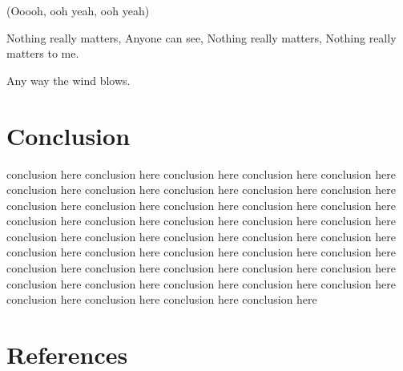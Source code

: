 \documentclass{gshs_poster_rpt}
\begin{document}
\begin{multicols}{3}
(Ooooh, ooh yeah, ooh yeah)

Nothing really matters,
Anyone can see,
Nothing really matters,
Nothing really matters to me.

Any way the wind blows.

\section*{Conclusion}
conclusion here conclusion here conclusion here conclusion here conclusion here conclusion here conclusion here conclusion here conclusion here conclusion here conclusion here conclusion here conclusion here conclusion here conclusion here conclusion here conclusion here conclusion here conclusion here conclusion here conclusion here conclusion here conclusion here conclusion here conclusion here conclusion here conclusion here conclusion here conclusion here conclusion here conclusion here conclusion here conclusion here conclusion here conclusion here conclusion here conclusion here conclusion here conclusion here conclusion here conclusion here conclusion here conclusion here conclusion here 

\section*{References}



\end{multicols}
\end{document}
